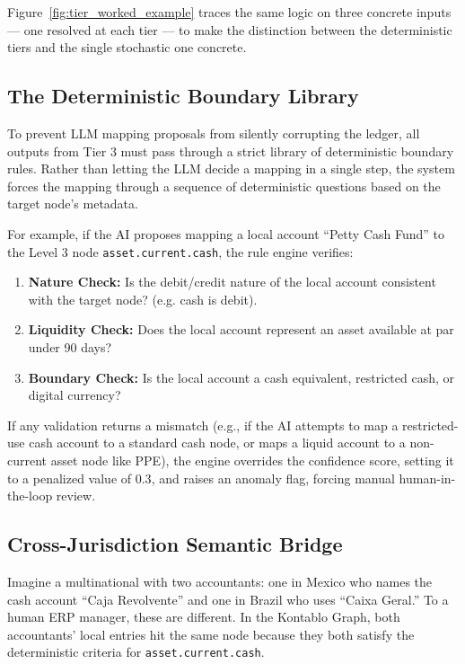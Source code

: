 

Figure~\ref{fig:tier_worked_example} traces the same logic on three concrete
inputs --- one resolved at each tier --- to make the distinction between the
deterministic tiers and the single stochastic one concrete.



\subsection{The Deterministic Boundary Library}
\label{subsec:boundary_library}
To prevent LLM mapping proposals from silently corrupting the ledger, all outputs from Tier 3 must pass through a strict library of deterministic boundary rules. Rather than letting the LLM decide a mapping in a single step, the system forces the mapping through a sequence of deterministic questions based on the target node's metadata. 

For example, if the AI proposes mapping a local account ``Petty Cash Fund'' to the Level 3 node \texttt{asset.current.cash}, the rule engine verifies:
\begin{enumerate}
    \item \textbf{Nature Check:} Is the debit/credit nature of the local account consistent with the target node? (e.g. cash is debit).
    \item \textbf{Liquidity Check:} Does the local account represent an asset available at par under 90 days?
    \item \textbf{Boundary Check:} Is the local account a cash equivalent, restricted cash, or digital currency?
\end{enumerate}

If any validation returns a mismatch (e.g., if the AI attempts to map a restricted-use cash account to a standard cash node, or maps a liquid account to a non-current asset node like PPE), the engine overrides the confidence score, setting it to a penalized value of $0.3$, and raises an anomaly flag, forcing manual human-in-the-loop review.



\subsection{Cross-Jurisdiction Semantic Bridge}
Imagine a multinational with two accountants: one in Mexico who names the cash account ``Caja Revolvente'' and one in Brazil who uses ``Caixa Geral.'' To a human ERP manager, these are different. In the Kontablo Graph, both accountants' local entries hit the same node because they both satisfy the deterministic criteria for \texttt{asset.current.cash}.

